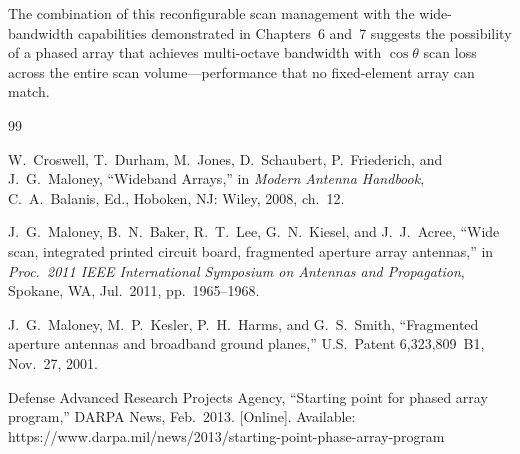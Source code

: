 The combination of this reconfigurable scan management with the wide-bandwidth capabilities demonstrated in Chapters~6 and~7 suggests the possibility of a phased array that achieves multi-octave bandwidth with $\cos\theta$ scan loss across the entire scan volume---performance that no fixed-element array can match.

\FloatBarrier

\begin{thebibliography}{99}

 W.~Croswell, T.~Durham, M.~Jones, D.~Schaubert, P.~Friederich, and J.~G.~Maloney, ``Wideband Arrays,'' in \emph{Modern Antenna Handbook}, C.~A.~Balanis, Ed., Hoboken, NJ: Wiley, 2008, ch.~12.

 J.~G.~Maloney, B.~N.~Baker, R.~T.~Lee, G.~N.~Kiesel, and J.~J.~Acree, ``Wide scan, integrated printed circuit board, fragmented aperture array antennas,'' in \emph{Proc.\ 2011 IEEE International Symposium on Antennas and Propagation}, Spokane, WA, Jul.\ 2011, pp.\ 1965--1968.

 J.~G.~Maloney, M.~P.~Kesler, P.~H.~Harms, and G.~S.~Smith, ``Fragmented aperture antennas and broadband ground planes,'' U.S.\ Patent 6,323,809~B1, Nov.\ 27, 2001.

 Defense Advanced Research Projects Agency, ``Starting point for phased array program,'' DARPA News, Feb.\ 2013. [Online]. Available: https://www.darpa.mil/news/2013/starting-point-phase-array-program

\end{thebibliography}

